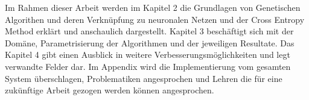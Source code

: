 Im Rahmen dieser Arbeit werden im Kapitel 2 die Grundlagen von Genetischen Algorithen und deren Verknüpfung zu neuronalen Netzen und der Cross Entropy Method erklärt und anschaulich dargestellt. Kapitel 3 beschäftigt sich mit der Domäne, Parametrisierung der Algorithmen und der jeweiligen Resultate. Das Kapitel 4 gibt einen Ausblick in weitere Verbesserungsmöglichkeiten und legt verwandte Felder dar. Im Appendix wird die Implementierung vom gesamten System überschlagen, Problematiken angesprochen und Lehren die für eine zukünftige Arbeit gezogen werden können angesprochen.